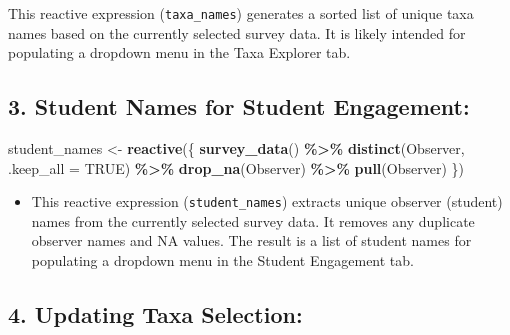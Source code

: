 \documentclass[
]{book}
\newenvironment{Shaded}{\begin{snugshade}}{\end{snugshade}}
\newcommand{\AttributeTok}[1]{\textcolor[rgb]{0.13,0.29,0.53}{#1}}
\newcommand{\ConstantTok}[1]{\textcolor[rgb]{0.56,0.35,0.01}{#1}}
\newcommand{\ControlFlowTok}[1]{\textcolor[rgb]{0.13,0.29,0.53}{\textbf{#1}}}
\newcommand{\FunctionTok}[1]{\textcolor[rgb]{0.13,0.29,0.53}{\textbf{#1}}}
\newcommand{\NormalTok}[1]{#1}
\newcommand{\OtherTok}[1]{\textcolor[rgb]{0.56,0.35,0.01}{#1}}
\newcommand{\SpecialCharTok}[1]{\textcolor[rgb]{0.81,0.36,0.00}{\textbf{#1}}}
\newcommand{\StringTok}[1]{\textcolor[rgb]{0.31,0.60,0.02}{#1}}
\providecommand{\tightlist}{%
  \setlength{\itemsep}{0pt}\setlength{\parskip}{0pt}}
\begin{document}
This reactive expression (\texttt{taxa\_names}) generates a sorted list of unique taxa names based on the currently selected survey data. It is likely intended for populating a dropdown menu in the Taxa Explorer tab.

\hypertarget{student-names-for-student-engagement}{%
\subsection{3. Student Names for Student Engagement:}\label{student-names-for-student-engagement}}

\begin{Shaded}
\begin{Highlighting}[]
\NormalTok{student\_names }\OtherTok{\textless{}{-}} \FunctionTok{reactive}\NormalTok{(\{}
  \FunctionTok{survey\_data}\NormalTok{() }\SpecialCharTok{\%\textgreater{}\%}
    \FunctionTok{distinct}\NormalTok{(Observer, }\AttributeTok{.keep\_all =} \ConstantTok{TRUE}\NormalTok{) }\SpecialCharTok{\%\textgreater{}\%}
    \FunctionTok{drop\_na}\NormalTok{(Observer) }\SpecialCharTok{\%\textgreater{}\%}
    \FunctionTok{pull}\NormalTok{(Observer)}
\NormalTok{\})}
\end{Highlighting}
\end{Shaded}

\begin{itemize}
\tightlist
\item
  This reactive expression (\texttt{student\_names}) extracts unique observer (student) names from the currently selected survey data. It removes any duplicate observer names and NA values. The result is a list of student names for populating a dropdown menu in the Student Engagement tab.
\end{itemize}

\hypertarget{updating-taxa-selection}{%
\subsection{4. Updating Taxa Selection:}\label{updating-taxa-selection}}

\begin{Shaded}
\end{Shaded}
\end{document}
